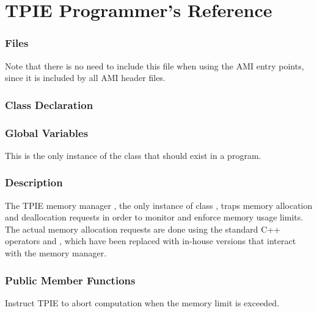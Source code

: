 \chapter{TPIE Programmer's Reference}


\subsection{Files}
  \btabb
     {Note that there is no need to
include this file when using the AMI entry points, since it is included by
all AMI header files.}
  \etabb

\subsection{Class Declaration}
  \btabb
     {}
  \etabb

\subsection{Global Variables}
  \btabb
     {This is the only instance of
the  class that should exist in a program.}
  \etabb

\subsection{Description}
The TPIE memory manager , the only instance of class
, traps memory allocation and deallocation requests in
order to monitor and enforce memory usage limits. The actual memory
allocation requests are done using the standard C++ operators 
and , which have been replaced with in-house versions that
interact with the memory manager.

\subsection{Public Member Functions}
  \btabb

     {Instruct TPIE to
    abort computation when the memory limit is exceeded.}

